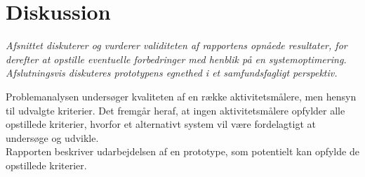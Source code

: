 \section{Diskussion}\label{sec:diskussion}
\textit{Afsnittet diskuterer og vurderer validiteten af rapportens opnåede resultater, for derefter at opstille eventuelle forbedringer med henblik på en systemoptimering. Afslutningsvis diskuteres prototypens egnethed i et samfundsfagligt perspektiv.}

Problemanalysen undersøger kvaliteten af en række aktivitetsmålere, men hensyn til udvalgte kriterier. Det fremgår heraf, at ingen aktivitetsmålere opfylder alle opstillede kriterier, hvorfor et alternativt system vil være fordelagtigt at undersøge og udvikle. \\
Rapporten beskriver udarbejdelsen af en prototype, som potentielt kan opfylde de opstillede kriterier. 

